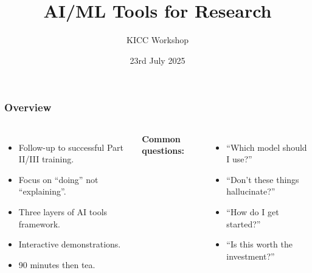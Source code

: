 \documentclass[aspectratio=169]{beamer}
\title{AI/ML Tools for Research}
\subtitle{KICC Workshop}
\date{23rd July 2025}
\begin{document}
\begin{frame}
    \titlepage
\end{frame}

\begin{frame}
    \frametitle{Overview}
    
    \begin{columns}
        \begin{itemize}
            \item Follow-up to successful Part II/III training.
            \item Focus on ``doing'' not ``explaining''.
            \item Three layers of AI tools framework.
            \item Interactive demonstrations.
            \item 90 minutes then tea.
        \end{itemize}
        
        \textbf{Common questions:}
        \begin{itemize}
            \item ``Which model should I use?''
            \item ``Don't these things hallucinate?''
            \item ``How do I get started?''
            \item ``Is this worth the investment?''
        \end{itemize}
    \end{columns}
\end{frame}
\end{document}
